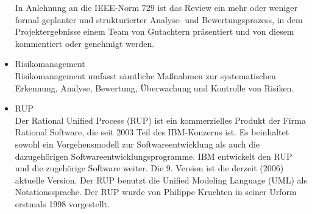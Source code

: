 \begin{itemize}
In Anlehnung an die IEEE-Norm 729 ist das Review ein mehr oder weniger formal geplanter und strukturierter Analyse- und Bewertungsprozess, in dem Projektergebnisse einem Team von Gutachtern präsentiert und von diesem kommentiert oder genehmigt werden.
\item 	Risikomanagement\\
Risikomanagement umfasst sämtliche Maßnahmen zur systematischen Erkennung, Analyse, Bewertung, Überwachung und Kontrolle von Risiken.
\item 	RUP\\Der Rational Unified Process (RUP) ist ein kommerzielles Produkt der Firma Rational Software, die seit 2003 Teil des IBM-Konzerns ist. Es beinhaltet sowohl ein Vorgehensmodell zur Softwareentwicklung als auch die dazugehörigen Softwareentwicklungsprogramme. IBM entwickelt den RUP und die zugehörige Software weiter. Die 9. Version ist die derzeit (2006) aktuelle Version. Der RUP benutzt die Unified Modeling Language (UML) als Notationssprache. Der RUP wurde von Philippe Kruchten in seiner Urform erstmals 1998 vorgestellt.


\end{itemize}
